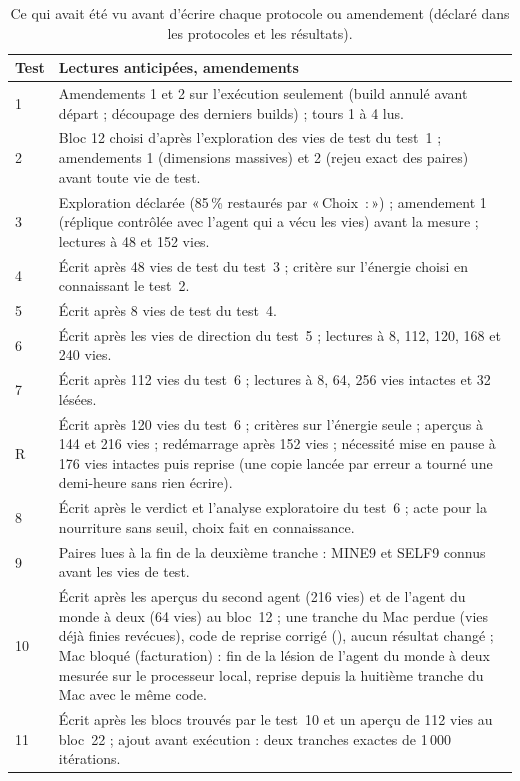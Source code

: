 \documentclass[11pt,a4paper]{article}
\newcommand{\Choix}{«\,Choix~:\,»}
\newcommand{\code}[1]{\texttt{\detokenize{#1}}}
\begin{document}
\begin{table}[tp]
\centering
\caption{Ce qui avait été vu avant d'écrire chaque protocole ou amendement (déclaré
dans les protocoles et les résultats).}
\label{tab-peeks}
\small
\begin{tabularx}{\textwidth}{@{}l X@{}}
\toprule
Test & Lectures anticipées, amendements \\
\midrule
1 & Amendements 1 et 2 sur l'exécution seulement (build annulé avant départ ; découpage des derniers builds) ; tours 1 à 4 lus. \\
2 & Bloc 12 choisi d'après l'exploration des vies de test du test~1 ; amendements 1 (dimensions massives) et 2 (rejeu exact des paires) avant toute vie de test. \\
3 & Exploration déclarée (85\,\% restaurés par \Choix{}) ; amendement 1 (réplique contrôlée avec l'agent qui a vécu les vies) avant la mesure ; lectures à 48 et 152 vies. \\
4 & Écrit après 48 vies de test du test~3 ; critère sur l'énergie choisi en connaissant le test~2. \\
5 & Écrit après 8 vies de test du test~4. \\
6 & Écrit après les vies de direction du test~5 ; lectures à 8, 112, 120, 168 et 240 vies. \\
7 & Écrit après 112 vies du test~6 ; lectures à 8, 64, 256 vies intactes et 32 lésées. \\
R & Écrit après 120 vies du test~6 ; critères sur l'énergie seule ; aperçus à 144 et 216 vies ; redémarrage après 152 vies ; nécessité mise en pause à 176 vies intactes puis reprise (une copie lancée par erreur a tourné une demi-heure sans rien écrire). \\
8 & Écrit après le verdict et l'analyse exploratoire du test~6 ; acte pour la nourriture sans seuil, choix fait en connaissance. \\
9 & Paires lues à la fin de la deuxième tranche : MINE9 et SELF9 connus avant les vies de test. \\
10 & Écrit après les aperçus du second agent (216 vies) et de l'agent du monde à deux (64 vies) au bloc~12 ; une tranche du Mac perdue (vies déjà finies revécues), code de reprise corrigé (\code{de2c1b4}), aucun résultat changé ; Mac bloqué (facturation) : fin de la lésion de l'agent du monde à deux mesurée sur le processeur local, reprise depuis la huitième tranche du Mac avec le même code. \\
11 & Écrit après les blocs trouvés par le test~10 et un aperçu de 112 vies au bloc~22 ; ajout avant exécution : deux tranches exactes de 1\,000 itérations. \\

\end{tabularx}
\end{table}
\end{document}
